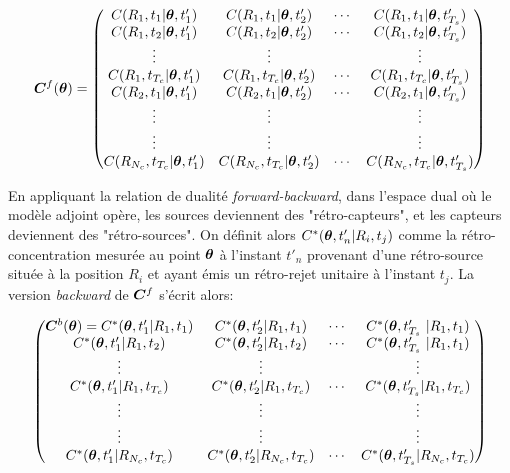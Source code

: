 \begin{equation}
{\bm{C}}^f({\bm{\theta}}) = 
\begin{pmatrix}
C(R_1,t_1 | {\bm{\theta}}, t'_1) & C(R_1,t_1 | {\bm{\theta}}, t'_2) & \cdots & C(R_1, t_1 |{\bm{\theta}}, t'_{T_s}) \\
C(R_1,t_2 | {\bm{\theta}}, t'_1) & C(R_1,t_2 | {\bm{\theta}}, t'_2) & \cdots & C(R_1, t_2 |{\bm{\theta}}, t'_{T_s}) \\
\vdots & \vdots & & \vdots \\
C(R_1,t_{T_c} | {\bm{\theta}}, t'_1) & C(R_1,t_{T_c} | {\bm{\theta}}, t'_2) & \cdots & C(R_1, t_{T_c} |{\bm{\theta}}, t'_{T_s}) \\
C(R_2,t_1| {\bm{\theta}}, t'_1) & C(R_2,t_1 | {\bm{\theta}}, t'_2) & \cdots & C(R_2, t_1 |{\bm{\theta}}, t'_{T_s}) \\
\vdots & \vdots & & \vdots \\
\vdots & \vdots & & \vdots \\
C(R_{N_c},t_{T_c} | {\bm{\theta}}, t'_1) & C(R_{N_c},t_{T_c} | {\bm{\theta}}, t'_2) & \cdots & C(R_{N_c}, t_{T_c} |{\bm{\theta}}, t'_{T_s}) \\
\end{pmatrix}
\label{eq_matrix_forward}
\end{equation}

En appliquant la relation de dualité \textit{forward-backward}, dans l'espace dual où le modèle adjoint opère, les sources deviennent des "rétro-capteurs", et les capteurs deviennent des "rétro-sources". On définit alors $C^*({\bm{\theta}},t'_n | R_i, t_j)$ comme la rétro-concentration mesurée au point ${\bm{\theta}}$ à l'instant $t'_n$ provenant d'une rétro-source située à la position $R_i$ et ayant émis un rétro-rejet unitaire à l'instant $t_j$. La version \textit{backward} de ${\bm{C}}^f$ s'écrit alors:

\begin{equation}
\begin{pmatrix}
\MatC^b (\VecTheta)= 
	C^*(\VecTheta, t'_1 | R_1, t_1) & C^*(\VecTheta, t'_2 | R_1, t_1) & \cdots & C^*(\VecTheta, t'_{T_s} | R_1, t_1) \\
	C^*(\VecTheta, t'_1 | R_1, t_2) & C^*(\VecTheta, t'_2 | R_1, t_2) & \cdots & C^*(\VecTheta, t'_{T_s} | R_1, t_1) \\
	\vdots & \vdots & & \vdots \\
	C^*(\VecTheta, t'_1| R_1,t_{T_c}) & C^*(\VecTheta, t'_2 | R_1, t_{T_c}) & \cdots & C^*(\VecTheta, t'_{T_s} | R_1, t_{T_c}) \\ 
	\vdots & \vdots & & \vdots \\
	\vdots & \vdots & & \vdots \\
	C^*(\VecTheta, t'_1| R_{N_c},t_{T_c}) & C^*(\VecTheta, t'_2 | R_{N_c}, t_{T_c}) & \cdots & C^*(\VecTheta, t'_{T_s} | R_{N_c}, t_{T_c}) \\ 
	
\end{pmatrix}
\label{eq_matrix_backward}
\end{equation}

